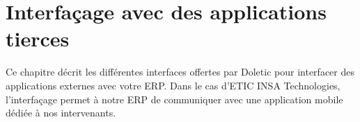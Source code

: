 \chapter{Interfaçage avec des applications tierces}

Ce chapitre décrit les différentes interfaces offertes par Doletic pour interfacer des applications externes avec votre ERP. Dans le cas d'ETIC INSA Technologies, l'interfaçage permet à notre ERP de communiquer avec une application mobile dédiée à nos intervenants.